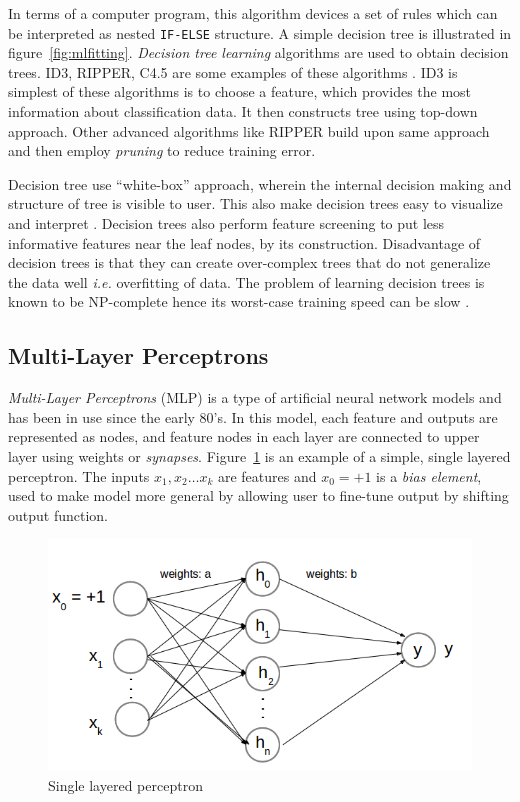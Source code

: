 In terms of a computer program, this algorithm devices a set of rules which can be interpreted as nested \texttt{IF-ELSE} structure. A simple decision tree is illustrated in figure~\ref{fig:mlfitting}. \emph{Decision tree learning} algorithms are used to obtain decision trees. ID3, RIPPER, C4.5 are some examples of these algorithms \cite{Mitchell1997}. ID3 \cite{Quinlan1986} is simplest of these algorithms is to choose a feature, which provides the most information about classification data. It then constructs tree using top-down approach. Other advanced algorithms like RIPPER \cite{Cohen1995} build upon same approach and then employ \emph{pruning} to reduce training error.

Decision tree use \enquote{white-box} approach, wherein the internal decision making and structure of tree is visible to user. This also make decision trees easy to visualize and interpret \cite{Kotsiantis2013}. Decision trees also perform feature screening to put less informative features near the leaf nodes, by its construction. Disadvantage of decision trees is that they can create over-complex trees that do not generalize the data well \emph{i.e.} overfitting of data. The problem of learning decision trees is known to be NP-complete hence its worst-case training speed can be slow \cite{Hyafil1976}.

\subsection{Multi-Layer Perceptrons}
\emph{Multi-Layer Perceptrons} (MLP) is a type of artificial neural network models and has been in use since the early 80's. In this model, each feature and outputs are represented as nodes, and feature nodes in each layer are connected to upper layer using weights or \emph{synapses}. Figure~\ref{fig:perceptron} is an example of a simple, single layered perceptron. The inputs $x_1, x_2 \ldots x_k$ are features and $x_0 = +1$ is a \emph{bias element}, used to make model more general by allowing user to fine-tune output by shifting output function.

\begin{figure}[h]
  \begin{center}
    \captionsetup{justification=centering}
    \includegraphics[scale=0.45]{figures/perceptron.png}
    \caption{Single layered perceptron}
    \label{fig:perceptron}
  \end{center}
\end{figure}

